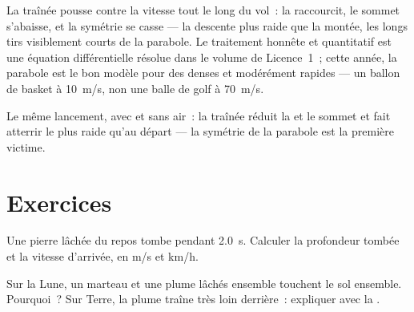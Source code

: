 \begin{remark}\label{rem:g12:projectile-motion:drag}
La traînée pousse contre la vitesse tout le long du vol~: la
 raccourcit, le sommet s'abaisse, et la symétrie se
casse --- la descente plus raide que la montée, les longs tirs
visiblement courts de la parabole. Le traitement honnête et quantitatif
est une équation différentielle résolue dans le volume de Licence~1~;
cette année, la parabole est le bon modèle pour des
 denses et modérément rapides --- un ballon
de basket à \qty{10}{m/s}, non une balle de golf à \qty{70}{m/s}.
\end{remark}

\begin{omfigure}

{\small Le même lancement, avec et sans air~: la traînée réduit la  et le sommet
et fait atterrir le  plus raide qu'au départ --- la symétrie
de la parabole est la première victime.}
\end{omfigure}

\section{Exercices}

\begin{exercise}[$\star$]\label{exo:g12:projectile-motion:1}
Une pierre lâchée du repos tombe pendant \qty{2.0}{s}. Calculer la
profondeur tombée et la vitesse d'arrivée, en \unit{m/s} et
\unit{km/h}.
\end{exercise}

\begin{exercise}[$\star$]\label{exo:g12:projectile-motion:2}
Sur la Lune, un marteau et une plume lâchés ensemble touchent le sol
ensemble. Pourquoi~? Sur Terre, la plume traîne très loin derrière~:
expliquer avec la .
\end{exercise}

